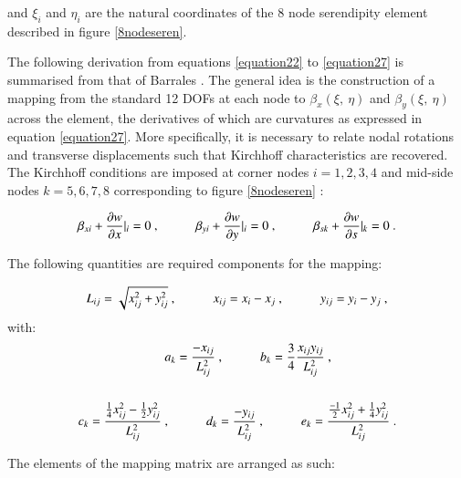 and $\xi_i$ and $\eta_i$ are the natural coordinates of the 8 node serendipity element described in figure \ref{8nodeseren}.

The following derivation from equations \eqref{equation22} to \eqref{equation27} is summarised from that of Barrales \cite{Bar12}. The general idea is the construction of a mapping from the standard 12 DOFs at each node to $\beta_x (\xi,\ \eta)$ and $\beta_y (\xi,\ \eta)$ across the element, the derivatives of which are curvatures as expressed in equation \eqref{equation27}. More specifically, it is necessary to relate nodal rotations and transverse displacements such that Kirchhoff characteristics are recovered. The Kirchhoff conditions are imposed at corner nodes $i = 1, 2, 3, 4$ and mid-side nodes $k = 5, 6, 7, 8$ corresponding to figure \ref{8nodeseren} \cite{Bar12}:

\begin{equation} 
\beta_{xi} + \frac{\partial w}{\partial x} \rvert_i = 0\ ,
\hspace{10mm}
\beta_{yi} + \frac{\partial w}{\partial y} \rvert_i = 0\ ,
\hspace{10mm}
\beta_{sk} + \frac{\partial w}{\partial s} \rvert_k = 0
\label{eqsdkt_1}\ .
\end{equation}

The following quantities are required components for the mapping:

\begin{equation} 
L_{ij} = \sqrt{x_{ij}^2 + y_{ij}^2}\ ,
\hspace{10mm}
x_{ij} = x_i - x_j\ ,
\hspace{10mm}
y_{ij} = y_i - y_j
\label{equation22}\ ,
\end{equation}
with:
\begin{gather} 
	\begin{aligned}
		&a_k = \frac{-x_{ij}}{L_{ij}^2}\ ,
		\hspace{10mm}
		b_k = \frac{3}{4} \frac{x_{ij} y_{ij}}{L_{ij}^2}\ , 
		\\
		\\
		c_k = \frac{\frac{1}{4} x_{ij}^2 - \frac{1}{2} y_{ij}^2}{L_{ij}^2}\
		& ,
		\hspace{10mm}
		d_k = \frac{-y_{ij}}{L_{ij}^2}\ ,
		\hspace{10mm}
		e_k = \frac{\frac{-1}{2} x_{ij}^2 + \frac{1}{4} y_{ij}^2}{L_{ij}^2}
		\label{equation23}\ .
	\end{aligned}
\end{gather}

The elements of the mapping matrix are arranged as such:

